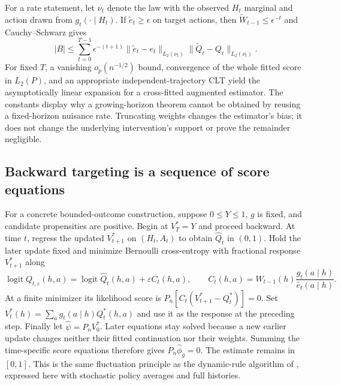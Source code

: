 For a rate statement, let $\nu_t$ denote the law with the observed
$H_t$ marginal and action drawn from $g_t(\cdot\mid H_t)$. If
$\widetilde e_t\ge\epsilon$ on target actions, then
$\widetilde W_{t-1}\le\epsilon^{-t}$ and Cauchy--Schwarz gives
\begin{equation}
 |B|\le\sum_{t=0}^{T-1}\epsilon^{-(t+1)}
 \|\widetilde e_t-e_t\|_{L_2(\nu_t)}
 \|\widetilde Q_t-Q_t\|_{L_2(\nu_t)}.
 \label{r3:long-rate-bound}
\end{equation}
For fixed $T$, a vanishing $o_p(n^{-1/2})$ bound, convergence of the
whole fitted score in $L_2(P)$, and an appropriate independent-trajectory
CLT yield the asymptotically linear expansion for a cross-fitted
augmented estimator. The constants display why a growing-horizon
theorem cannot be obtained by reusing a fixed-horizon nuisance rate.
Truncating weights changes the estimator's bias; it does not change the
underlying intervention's support or prove the remainder negligible.

\subsection{Backward targeting is a sequence of score equations}
\label{r3:long-targeting}
For a concrete bounded-outcome construction, suppose $0\le Y\le1$,
$g$ is fixed, and candidate propensities are positive. Begin at
$V_T^*=Y$ and proceed backward. At time $t$, regress the updated
$V_{t+1}^*$ on $(H_t,A_t)$ to obtain $\widehat Q_t$ in $(0,1)$.
Hold the later update fixed and minimize Bernoulli cross-entropy with
fractional response $V_{t+1}^*$ along
\begin{equation}
 \operatorname{logit}Q_{t,\varepsilon}(h,a)
 =\operatorname{logit}\widehat Q_t(h,a)
       +\varepsilon C_t(h,a),\qquad
 C_t(h,a)=\widehat W_{t-1}(h)
                   \frac{g_t(a\mid h)}{\widehat e_t(a\mid h)}.
 \label{r3:long-fluctuation}
\end{equation}
At a finite minimizer its likelihood score is
$P_n[C_t(V_{t+1}^*-Q_t^*)]=0$. Set
$V_t^*(h)=\sum_a g_t(a\mid h)Q_t^*(h,a)$ and use it as the
response at the preceding step. Finally let
$\widehat\psi=P_n V_0^*$. Later equations stay solved because a
new earlier update changes neither their fitted continuation nor their
weights. Summing the time-specific score equations therefore gives
$P_n\widehat\phi_g=0$. The estimate remains in $[0,1]$.
This is the same fluctuation principle as the dynamic-rule algorithm
of \citet[Chapter 4, Sections 4.4.2--4.4.3]{targeted2018}, expressed
here with stochastic policy averages and full histories.

